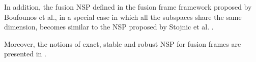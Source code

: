 In addition, the fusion NSP defined in the fusion frame framework proposed by Boufounos et al., in a special case in which all the subspaces share the same dimension, becomes similar to the NSP proposed by Stojnic et al. \cite{Boufounos2011}.

Moreover, the notions of exact, stable and robust NSP for fusion frames are presented in \cite{Ayaz2014,Ayaz2016}.